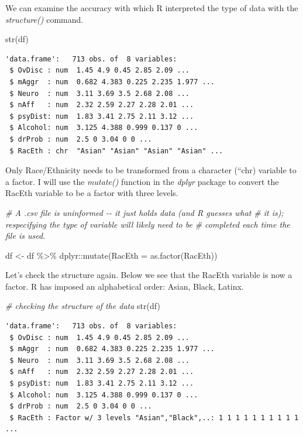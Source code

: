 \documentclass[
  11pt,
]{book}
\newenvironment{Shaded}{\begin{snugshade}}{\end{snugshade}}
\newcommand{\AttributeTok}[1]{\textcolor[rgb]{0.77,0.63,0.00}{#1}}
\newcommand{\CommentTok}[1]{\textcolor[rgb]{0.56,0.35,0.01}{\textit{#1}}}
\newcommand{\FunctionTok}[1]{\textcolor[rgb]{0.00,0.00,0.00}{#1}}
\newcommand{\NormalTok}[1]{#1}
\newcommand{\OtherTok}[1]{\textcolor[rgb]{0.56,0.35,0.01}{#1}}
\newcommand{\SpecialCharTok}[1]{\textcolor[rgb]{0.00,0.00,0.00}{#1}}
\begin{document}
We can examine the accuracy with which R interpreted the type of data with the \emph{structure()} command.

\begin{Shaded}
\begin{Highlighting}[]
\FunctionTok{str}\NormalTok{(df)}
\end{Highlighting}
\end{Shaded}

\begin{verbatim}
'data.frame':   713 obs. of  8 variables:
 $ OvDisc : num  1.45 4.9 0.45 2.85 2.09 ...
 $ mAggr  : num  0.682 4.383 0.225 2.235 1.977 ...
 $ Neuro  : num  3.11 3.69 3.5 2.68 2.08 ...
 $ nAff   : num  2.32 2.59 2.27 2.28 2.01 ...
 $ psyDist: num  1.83 3.41 2.75 2.11 3.12 ...
 $ Alcohol: num  3.125 4.388 0.999 0.137 0 ...
 $ drProb : num  2.5 0 3.04 0 0 ...
 $ RacEth : chr  "Asian" "Asian" "Asian" "Asian" ...
\end{verbatim}

Only Race/Ethnicity needs to be transformed from a character (``chr) variable to a factor. I will use the \emph{mutate()} function in the \emph{dplyr} package to convert the RacEth variable to be a factor with three levels.

\begin{Shaded}
\begin{Highlighting}[]
\CommentTok{\# A .csv file is uninformed {-}{-} it just holds data (and R guesses what}
\CommentTok{\# it is); respecifying the type of variable will likely need to be}
\CommentTok{\# completed each time the file is used.}

\NormalTok{df }\OtherTok{\textless{}{-}}\NormalTok{ df }\SpecialCharTok{\%\textgreater{}\%}
\NormalTok{    dplyr}\SpecialCharTok{::}\FunctionTok{mutate}\NormalTok{(}\AttributeTok{RacEth =} \FunctionTok{as.factor}\NormalTok{(RacEth))}
\end{Highlighting}
\end{Shaded}

Let's check the structure again. Below we see that the RacEth variable is now a factor. R has imposed an alphabetical order: Asian, Black, Latinx.

\begin{Shaded}
\begin{Highlighting}[]
\CommentTok{\# checking the structure of the data}
\FunctionTok{str}\NormalTok{(df)}
\end{Highlighting}
\end{Shaded}

\begin{verbatim}
'data.frame':   713 obs. of  8 variables:
 $ OvDisc : num  1.45 4.9 0.45 2.85 2.09 ...
 $ mAggr  : num  0.682 4.383 0.225 2.235 1.977 ...
 $ Neuro  : num  3.11 3.69 3.5 2.68 2.08 ...
 $ nAff   : num  2.32 2.59 2.27 2.28 2.01 ...
 $ psyDist: num  1.83 3.41 2.75 2.11 3.12 ...
 $ Alcohol: num  3.125 4.388 0.999 0.137 0 ...
 $ drProb : num  2.5 0 3.04 0 0 ...
 $ RacEth : Factor w/ 3 levels "Asian","Black",..: 1 1 1 1 1 1 1 1 1 1 ...
\end{verbatim}
\end{document}
